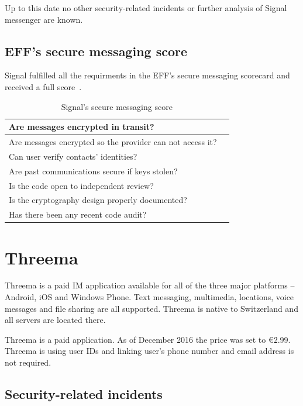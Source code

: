 \documentclass[thesis=M,english]{FITthesis}[2012/10/20]
\newcommand{\cmark}{\ding{51}}%
\begin{document}
Up to this date no other security-related incidents or further analysis of Signal messenger are known.

\subsection{EFF's secure messaging score}

Signal fulfilled all the requirments in the EFF's secure messaging scorecard and received a full score~\cite{eff-score}.

\begin{table}[htb]
	\centering
	\caption{Signal's secure messaging score}
	\label{my-label}
	\begin{tabular}{|l|l|}
		\hline
		Are messages encrypted in transit? & \cmark \\\hline
		Are messages encrypted so the provider can not access it? & \cmark \\ \hline
		Can user verify contacts' identities? & \cmark \\ \hline
		Are past communications secure if keys stolen? & \cmark \\ \hline
		Is the code open to independent review? & \cmark \\ \hline
		Is the cryptography design properly documented? & \cmark \\ \hline
		Has there been any recent code audit? & \cmark \\ \hline
	\end{tabular}
\end{table}


\section{Threema}

Threema is a paid IM application available for all of the three major platforms -- Android, iOS and Windows Phone. Text messaging, multimedia, locations, voice messages and file sharing are all supported. Threema is native to Switzerland and all servers are located there.

Threema is a paid application. As of December 2016 the price was set to \euro2.99. Threema is using user IDs and linking user's phone number and email address is not required.

\subsection{Security-related incidents}
\end{document}
